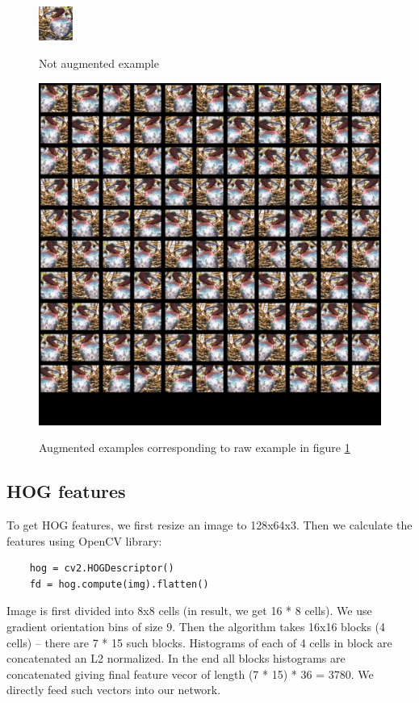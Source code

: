 ﻿\documentclass[a4paper]{article}
\begin{document}
\begin{figure}[h]
    \caption[]{Not augmented example}
    \centering
    \includegraphics[page=2,width=0.1\textwidth]{aug1.png}
    \label{fig:aug1}
\end{figure}

\begin{figure}[h]
    \caption[]{Augmented examples corresponding to raw example in figure \ref{fig:aug1}}
    \centering
    \includegraphics[page=2,width=1.0\textwidth]{aug2.png}
    \label{fig:aug2}
\end{figure}


\subsection{HOG features}
To get HOG features, we first resize an image to 128x64x3.
Then we calculate the features using OpenCV library:
\begin{verbatim}
    hog = cv2.HOGDescriptor()
    fd = hog.compute(img).flatten()
\end{verbatim}
Image is first divided into 8x8 cells (in result, we get 16 * 8 cells).
We use gradient orientation bins of size 9.
Then the algorithm takes 16x16 blocks (4 cells) --
there are 7 * 15 such blocks.
Histograms of each of 4 cells in block are concatenated an L2 normalized.
In the end all blocks histograms are concatenated giving
final feature vecor of length (7 * 15) * 36 = 3780.
We directly feed such vectors into our network.
\end{document}
